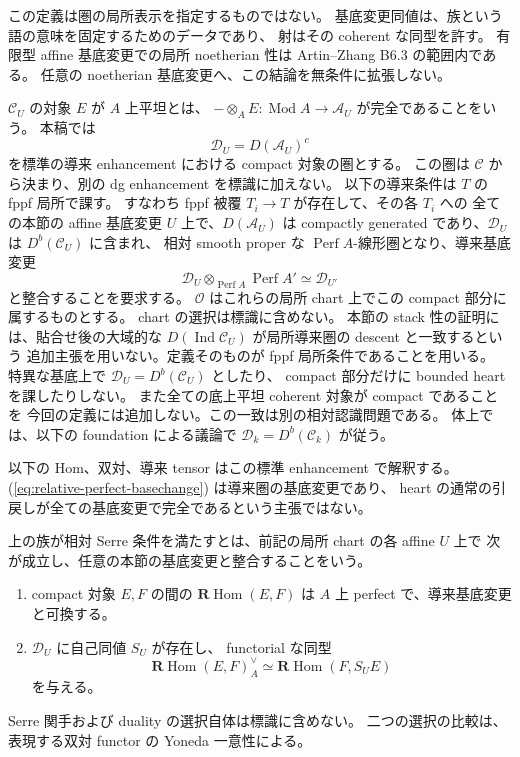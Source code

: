 この定義は圏の局所表示を指定するものではない。
基底変更同値は、族という語の意味を固定するためのデータであり、
射はその coherent な同型を許す。
有限型 affine 基底変更での局所 noetherian 性は
Artin--Zhang B6.3 の範囲内である。
任意の noetherian 基底変更へ、この結論を無条件に拡張しない。

$\mathcal C_U$ の対象 $E$ が $A$ 上平坦とは、
$-\otimes_AE:\operatorname{Mod}A\to\mathcal A_U$ が完全であることをいう。
本稿では
\[
 \mathcal D_U=D(\mathcal A_U)^c
\]
を標準の導来 enhancement における compact 対象の圏とする。
この圏は $\mathcal C$ から決まり、別の dg enhancement を標識に加えない。
以下の導来条件は $T$ の fppf 局所で課す。
すなわち fppf 被覆 $T_i\to T$ が存在して、その各 $T_i$ への
全ての本節の affine 基底変更 $U$ 上で、$D(\mathcal A_U)$ は
compactly generated であり、$\mathcal D_U$ は $D^b(\mathcal C_U)$ に含まれ、
相対 smooth proper な $\operatorname{Perf}A$-線形圏となり、導来基底変更
\[
 \mathcal D_U\otimes_{\operatorname{Perf}A}\operatorname{Perf}A'
       \simeq\mathcal D_{U'}
 \tag{RP-BC}\label{eq:relative-perfect-basechange}
\]
と整合することを要求する。
$\mathcal O$ はこれらの局所 chart 上でこの compact 部分に属するものとする。
chart の選択は標識に含めない。
本節の stack 性の証明には、貼合せ後の大域的な
$D(\operatorname{Ind}\mathcal C_U)$ が局所導来圏の descent と一致するという
追加主張を用いない。定義そのものが fppf 局所条件であることを用いる。
特異な基底上で $\mathcal D_U=D^b(\mathcal C_U)$ としたり、
compact 部分だけに bounded heart を課したりしない。
また全ての底上平坦 coherent 対象が compact であることを
今回の定義には追加しない。この一致は別の相対認識問題である。
体上では、以下の foundation による議論で
$\mathcal D_k=D^b(\mathcal C_k)$ が従う。

以下の Hom、双対、導来 tensor はこの標準 enhancement で解釈する。
(\ref{eq:relative-perfect-basechange}) は導来圏の基底変更であり、
heart の通常の引戻しが全ての基底変更で完全であるという主張ではない。

\begin{definition}[相対 Serre 条件]
\label{def:relative-serre-condition}
上の族が相対 Serre 条件を満たすとは、前記の局所 chart の各 affine $U$ 上で
次が成立し、任意の本節の基底変更と整合することをいう。
\begin{enumerate}
\item compact 対象 $E,F$ の間の $\mathbf R\operatorname{Hom}(E,F)$
  は $A$ 上 perfect で、導来基底変更と可換する。
\item $\mathcal D_U$ に自己同値 $S_U$ が存在し、
  functorial な同型
  \[
   \mathbf R\operatorname{Hom}(E,F)^\vee_A
       \simeq\mathbf R\operatorname{Hom}(F,S_UE)
  \]
  を与える。
\end{enumerate}
Serre 関手および duality の選択自体は標識に含めない。
二つの選択の比較は、表現する双対 functor の Yoneda 一意性による。
\end{definition}

